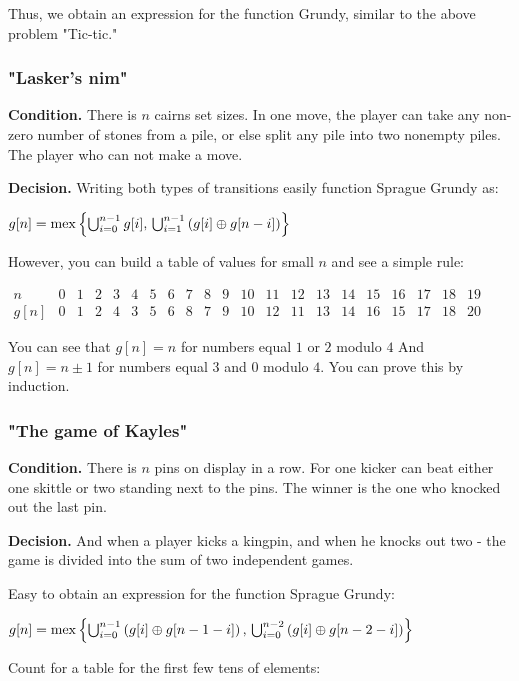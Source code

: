 Thus, we obtain an expression for the function Grundy, similar to the above problem "Tic-tic."

\subsubsection{ "Lasker's nim" }

\textbf{Condition.} There is $n$ cairns set sizes. In one move, the player can take any non-zero number of stones from a pile, or else split any pile into two nonempty piles. The player who can not make a move.

\textbf{Decision.} Writing both types of transitions easily function Sprague Grundy as:

$g[n]={\rm mex}\left\{ \bigcup_{i=0}^{n-1}g[i],\,\bigcup_{i=1}^{n-1}\left(g[i]\oplus g[n-i]\right)\right\} $

However, you can build a table of values ​​for small $n$ and see a simple rule:

$\begin{array}{ccccccccccccccccccccc}
n & 0 & 1 & 2 & 3 & 4 & 5 & 6 & 7 & 8 & 9 & 10 & 11 & 12 & 13 & 14 & 15 & 16 & 17 & 18 & 19\\
g[n] & 0 & 1 & 2 & 4 & 3 & 5 & 6 & 8 & 7 & 9 & 10 & 12 & 11 & 13 & 14 & 16 & 15 & 17 & 18 & 20
\end{array}$

You can see that $g [n] = n$ for numbers equal $1$ or $2$ modulo $4$ And $g [n] = n \pm 1$ for numbers equal $3$ and $0$ modulo $4$. You can prove this by induction.

\subsubsection{ "The game of Kayles" }

\textbf{Condition.} There is $n$ pins on display in a row. For one kicker can beat either one skittle or two standing next to the pins. The winner is the one who knocked out the last pin.

\textbf{Decision.} And when a player kicks a kingpin, and when he knocks out two - the game is divided into the sum of two independent games.

Easy to obtain an expression for the function Sprague Grundy:

$g[n]={\rm mex}\left\{ \bigcup_{i=0}^{n-1}\left(g[i]\oplus g[n-1-i]\right),\,\bigcup_{i=0}^{n-2}\left(g[i]\oplus g[n-2-i]\right)\right\} $

Count for a table for the first few tens of elements:

